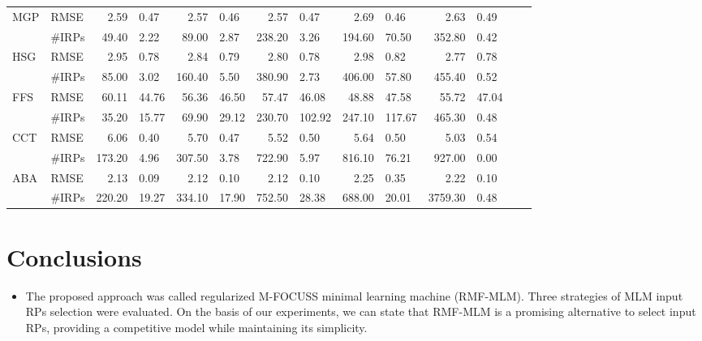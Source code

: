 \documentclass[final]{beamer}
\begin{document}
\begin{frame}[t]
\begin{multicols}{3}
\begin{table}[!ht]
\begin{center}
\begin{tabular}{ll r@{${}\pm{}$}l r@{${}\pm{}$}l r@{${}\pm{}$}l r@{${}\pm{}$}l r@{${}\pm{}$}l r@{${}\pm{}$}l}
\multirow{2}{*}{MGP}  & RMSE    &      2.59 &     0.47 &      2.57 &     0.46 &      2.57 &     0.47 &      2.69 &     0.46 &      2.63 &     0.49 \\ 
                      & \#IRPs  &     49.40 &     2.22 &     89.00 &     2.87 &    238.20 &     3.26 &    194.60 &    70.50 &    352.80 &     0.42 \\ \midrule

\multirow{2}{*}{HSG}  & RMSE    &      2.95 &     0.78 &      2.84 &     0.79 &      2.80 &     0.78 &      2.98 &     0.82 &      2.77 &     0.78 \\ 
                      & \#IRPs  &     85.00 &     3.02 &    160.40 &     5.50 &    380.90 &     2.73 &    406.00 &    57.80 &    455.40 &     0.52 \\ \midrule

\multirow{2}{*}{FFS}  & RMSE    &     60.11 &    44.76 &     56.36 &    46.50 &     57.47 &    46.08 &     48.88 &    47.58 &     55.72 &    47.04 \\ 
                      & \#IRPs  &     35.20 &    15.77 &     69.90 &    29.12 &    230.70 &   102.92 &    247.10 &   117.67 &    465.30 &     0.48 \\ \midrule

\multirow{2}{*}{CCT}  & RMSE    &      6.06 &     0.40 &      5.70 &     0.47 &      5.52 &     0.50 &      5.64 &     0.50 &      5.03 &     0.54 \\ 
                      & \#IRPs  &    173.20 &     4.96 &    307.50 &     3.78 &    722.90 &     5.97 &    816.10 &    76.21 &    927.00 &     0.00 \\ \midrule

\multirow{2}{*}{ABA}  & RMSE    &      2.13 &     0.09 &      2.12 &     0.10 &      2.12 &     0.10 &      2.25 &     0.35 &      2.22 &     0.10 \\ 
                      & \#IRPs  &    220.20 &    19.27 &    334.10 &    17.90 &    752.50 &   28.38 &    688.00 &     20.01 &   3759.30 &     0.48 \\ \bottomrule

\end{tabular}
\end{center}
\end{table}




\section{Conclusions}
\begin{itemize}
    \item The proposed approach was called regularized M-FOCUSS minimal learning machine (RMF-MLM). Three strategies of MLM input RPs selection were evaluated. On the basis of our experiments, we can state that RMF-MLM is a promising alternative to select input RPs, providing a competitive model while maintaining its simplicity. 
\end{itemize}



\end{multicols}
\end{frame}
\end{document}
